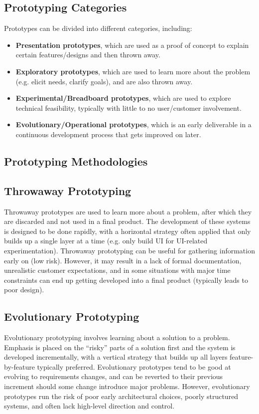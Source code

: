 \documentclass[12pt,titlepage]{article}
\begin{document}
    \subsection{Prototyping Categories}
      Prototypes can be divided into different categories, including:
      \begin{itemize}
        \item \textbf{Presentation prototypes}, which are used as a proof of concept to explain certain features/designs and then thrown away.
        \item \textbf{Exploratory prototypes}, which are used to learn more about the problem (e.g. elicit needs, clarify goals), and are also thrown away.
        \item \textbf{Experimental/Breadboard prototypes}, which are used to explore technical feasibility, typically with little to no user/customer involvement.
        \item \textbf{Evolutionary/Operational prototypes}, which is an early deliverable in a continuous development process that gets improved on later.
      \end{itemize}

    \subsection{Prototyping Methodologies}

      \subsection{Throwaway Prototyping}
        Throwaway prototypes are used to learn more about a problem, after which they are discarded and not used in a final product. The development of these systems is designed to be
        done rapidly, with a horizontal strategy often applied that only builds up a single layer at a time (e.g. only build UI for UI-related experimentation). Throwaway prototyping can
        be useful for gathering information early on (low risk). However, it may result in a lack of formal documentation, unrealistic customer expectations, and in some situations with
        major time constraints can end up getting developed into a final product (typically leads to poor design).

      \subsection{Evolutionary Prototyping}
        Evolutionary prototyping involves learning about a solution to a problem. Emphasis is placed on the ``risky'' parts of a solution first and the system is developed incrementally,
        with a vertical strategy that builds up all layers feature-by-feature typically preferred. Evolutionary prototypes tend to be good at evolving to requirements changes, and can be
        reverted to their previous increment should some change introduce major problems. However, evolutionary prototypes run the risk of poor early architectural choices, poorly
        structured systems, and often lack high-level direction and control.
\end{document}
